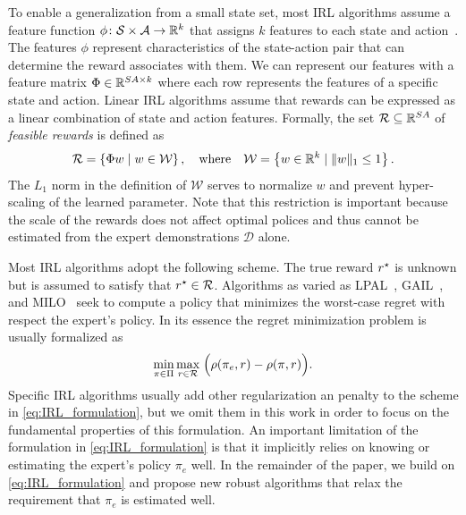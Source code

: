 \documentclass[10pt]{article}
\renewcommand{\cite}{\citep}
\begin{document}
To enable a generalization from a small state set, most IRL algorithms assume a feature function $\phi\colon \mathcal{S} \times \mathcal{A}\to \mathbb{R}^k$ that assigns $k$ features  to each state and action~\cite{Syed2008,Lacotte2019,chang2021mitigating}. The features $\phi$ represent characteristics of the state-action pair that can determine the reward associates with them. We can represent our features with a feature matrix $\Phi \in \mathbb{R}^{SA\times k}$ where each row represents the features of a specific state and action. Linear IRL algorithms assume that rewards can be expressed as a linear combination of state and action features. Formally, the set $\mathcal{R} \subseteq \mathbb{R}^{SA}$ of \emph{feasible rewards} is defined as
\[
  \mathcal{R} = \left\{ \Phi w \mid  w\in \mathcal{W} \right\}, \quad
  \text{where} \quad
  \mathcal{W} = \left\{ w \in \mathbb{R}^k \mid \| w \|_1 \le 1 \right\}. 
\]
The $L_1$ norm in the definition of $\mathcal{W}$ serves to normalize $w$ and prevent hyper-scaling of the learned parameter. Note that this restriction is important because the scale of the rewards does not affect optimal polices and thus cannot be estimated from the expert demonstrations $\mathcal{D}$ alone.

Most IRL algorithms adopt the following scheme. The true reward $r^{\mathnormal{\star}}$ is unknown but is assumed to satisfy that $r^{\mathnormal{\star}} \in \mathcal{R}$. Algorithms as varied as LPAL~\cite{Syed2008}, GAIL~\cite{Ho2016}, and MILO~\cite{chang2021mitigating} seek to compute a policy that minimizes the worst-case regret with respect the expert's policy. In its essence the regret minimization problem is usually formalized as
\begin{equation} \label{eq:IRL_formulation}
\min_{\pi \in \Pi} \max_{r \in \mathcal{R}} \; \Bigl( \rho(\pi_e, r) - \rho(\pi, r) \Bigr).
\end{equation}
Specific IRL algorithms usually add other regularization an penalty to the scheme in \eqref{eq:IRL_formulation}, but we omit them in this work in order to focus on the fundamental properties of this formulation.  An important limitation of the formulation in \eqref{eq:IRL_formulation} is that it implicitly relies on knowing or estimating the expert's policy $\pi_e$ well. In the remainder of the paper, we build on \eqref{eq:IRL_formulation} and propose new robust algorithms that relax the requirement that $\pi_e$ is estimated well.

\end{document}
